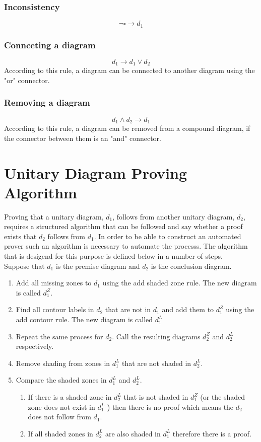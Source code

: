 \documentclass[10pt, a4paper, titlepage]{article}
\begin{document}
\subsubsection{Inconsistency}
 
$$ \neg \square \rightarrow d_{1}$$

\subsubsection{Connceting a diagram}
$$ d_{1} \rightarrow d_{1} \vee d_{2} $$
According to this rule, a diagram can be connected to another diagram using the "or" connector.

\subsubsection{Removing a diagram}
$$ d_{1} \wedge d_{2} \rightarrow d_{1} $$
According to this rule, a diagram can be removed from a compound diagram, if the connector between them is an "and" connector.

\section{Unitary Diagram Proving Algorithm}
\label{unitary_algorithm}
Proving that a unitary diagram, $d_{1}$, follows from another unitary diagram, $d_{2}$,  requires a structured algorithm that can be followed and say whether a proof exists that $d_{2}$ follows from $d_{1}$. In order to be able to construct an automated prover such an algorithm is necessary to automate the processs. The algorithm that is desigend for this purpose is defined below in a number of steps.\\
Suppose that $d_{1}$ is the premise diagram and $d_{2}$ is the conclusion diagram.

\begin{enumerate}

\item Add all missing zones to $d_{1}$ using the add shaded zone rule. The new diagram is called $ d^Z_{1} $.
\item Find all contour labels in $d_{2}$ that are not in $d_{1}$  and add them to $d^Z_{1}$ using the add contour rule. The new diagram is called $ d^L_{1} $
\item Repeat the same process for $d_{2}$. Call the resulting diagrams $ d^Z_{2} $ and $ d^L_{2} $ respectively. 
\item Remove shading from zones in $d^L_{1}$ that are not shaded in $d^L_{2}$.
\item Compare the shaded zones in $d^L_{1}$ and $d^L_{2}$. 
\begin{enumerate}
\item If there is a shaded zone in $d^L_{2}$ that is not shaded in $d^Z_{1}$ (or the shaded zone does not exist in $d^L_{1}$ ) then there is no proof which means the $d_{2}$ does not follow from $d_{1}$.
\item If all shaded zones in $d^L_{2}$ are also shaded in $d^L_{1}$ therefore there is a proof.    
\end{enumerate}

\end{enumerate}
\end{document}
